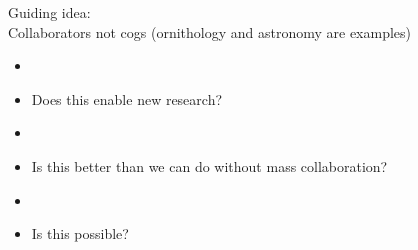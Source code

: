 \documentclass[aspectratio=169]{beamer}
\begin{document}
\begin{frame}

Guiding idea:\\
Collaborators not cogs (ornithology and astronomy are examples)

\end{frame}
\begin{frame}

\begin{itemize}
  \item{} 
  \item<2-> Does this enable new research?
\end{itemize}

\end{frame}
\begin{frame}

\begin{itemize}
  \item {} 
  \item<2-> Is this better than we can do without mass collaboration?
\end{itemize}

\end{frame}
\begin{frame}

\begin{itemize}
  \item {} 
  \item<2-> Is this possible?
\end{itemize}

\end{frame}
\frame{\titlepage}
\end{document}
